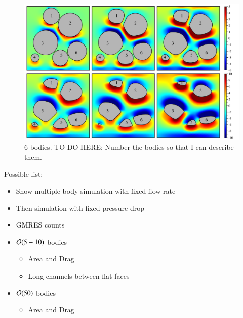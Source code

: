 \documentclass[preprint, 10pt]{elsarticle}
\begin{document}
\begin{figure}%
\begin{center}
\includegraphics[width = 0.9 \textwidth]{./figs/06bod.pdf}
\caption{\label{fig:50bodies} 6 bodies. TO DO HERE: Number the bodies so that I can describe them.
}
\end{center}
\end{figure}



\newpage


Possible list:
\begin{itemize}
\item Show multiple body simulation with fixed flow rate
\item Then simulation with fixed pressure drop
\item GMRES counts
%
\item ${\mathcal{O}}(5-10)$ bodies
	\begin{itemize}
	\item Area and Drag
	\item Long channels between flat faces
	\end{itemize}
\item ${\mathcal{O}}(50)$ bodies
	\begin{itemize}
	\item Area and Drag
	\end{itemize}
\end{itemize}
\end{document}
